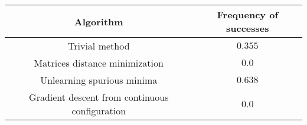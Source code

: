 \begin{tabular}{cc}
\toprule
Algorithm                                      & Frequency of successes \\ \midrule
Trivial method                           & $0.355$                \\
Matrices distance minimization                 & $0.0$                    \\ 
Unlearning spurious minima                     & $0.638$                    \\
Gradient descent from continuous configuration & $0.0$                    \\
\bottomrule
\end{tabular}
